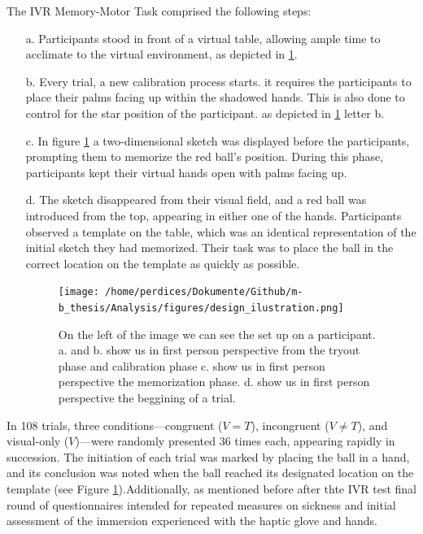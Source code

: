 \documentclass[12pt,oneside,openright]{report}
\begin{document}
The IVR Memory-Motor Task comprised the following steps:
 \begin{enumerate}
    \item[a.] Participants stood in front of a virtual table, allowing ample time to acclimate to the virtual environment, as depicted in \ref{fig:look}.
    
    \item[b.] Every trial, a new calibration process starts. it requires the participants to place their palms facing up within the shadowed hands. This is also done to control for the star position of the participant. as depicted in \ref{fig:look} letter b.

    \item[c.] In figure \ref*{fig:look} a two-dimensional sketch was displayed before the participants, prompting them to memorize the red ball's position. During this phase, participants kept their virtual hands open with palms facing up.

    \item[d.] The sketch disappeared from their visual field, and a red ball was introduced from the top, appearing in either one of the hands. Participants observed a template on the table, which was an identical representation of the initial sketch they had memorized. Their task was to place the ball in the correct location on the template as quickly as possible.

    \begin{figure}[!ht]
        \centering
        \texttt{[image: /home/perdices/Dokumente/Github/m-b\_thesis/Analysis/figures/design\_ilustration.png]}
        \caption{On the left of the image we can see the set up on a participant. a. and b. show us  in first person perspective from the tryout phase and calibration phase c. show us in first person perspective the memorization phase. d. show us in first person perspective the beggining of a trial.}
        \label{fig:look}
    \end{figure}
 \end{enumerate}

In 108 trials, three conditions—congruent ($V=T$), incongruent ($V \neq T$), and visual-only ($V$)—were randomly presented 36 times each, appearing rapidly in succession. The initiation of each trial was marked by placing the ball in a hand, and its conclusion was noted when the ball reached its designated location on the template (see Figure \ref{fig:look}).Additionally, as mentioned before after thte IVR test final round of questionnaires intended for repeated measures on sickness and initial assessment of the immersion experienced with the haptic glove and hands.
\end{document}
